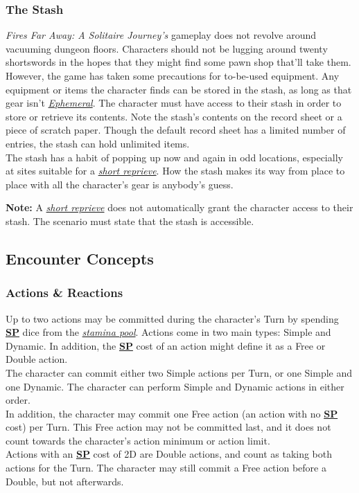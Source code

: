 \documentclass[12pt]{article}
\newcommand{\refto}[1]{\hyperlink{#1}{\textbf{#1}}}
\newcommand{\reftoit}[1]{\hyperlink{#1}{\emph{#1}}}
\begin{document}
\begin{multicols*}{2}
\subsubsection{The Stash}
\emph{Fires Far Away: A Solitaire Journey’s} gameplay does not revolve around vacuuming dungeon floors. Characters should not be lugging around twenty shortswords in the hopes that they might find some pawn shop that’ll take them. However, the game has taken some precautions for to-be-used equipment. Any equipment or items the character finds can be stored in the stash, as long as that gear isn’t \reftoit{Ephemeral}. The character must have access to their stash in order to store or retrieve its contents. Note the stash’s contents on the record sheet or a piece of scratch paper. Though the default record sheet has a limited number of entries, the stash can hold unlimited items.\\
The stash has a habit of popping up now and again in odd locations, especially at sites suitable for a \reftoit{short reprieve}. How the stash makes its way from place to place with all the character’s gear is anybody’s guess.\\

\begin{tcolorbox}
\textbf{Note:} A \reftoit{short reprieve} does not automatically grant the character access to their stash. The scenario must state that the stash is accessible.
\end{tcolorbox}

\vfill
\pagebreak

\subsection{Encounter Concepts}
\subsubsection{Actions \& Reactions}
Up to two actions may be committed during the character’s Turn by spending \refto{SP} dice from the \reftoit{stamina pool}. Actions come in two main types: Simple and Dynamic. In addition, the \refto{SP} cost of an action might define it as a Free or Double action.\\
The character can commit either two Simple actions per Turn, or one Simple and one Dynamic. The character can perform Simple and Dynamic actions in either order.\\
In addition, the character may commit one Free action (an action with no \refto{SP} cost) per Turn. This Free action may not be committed last, and it does not count towards the character’s action minimum or action limit.\\
Actions with an \refto{SP} cost of 2D are Double actions, and count as taking both actions for the Turn. The character may still commit a Free action before a Double, but not afterwards.


\end{multicols*}
\end{document}

